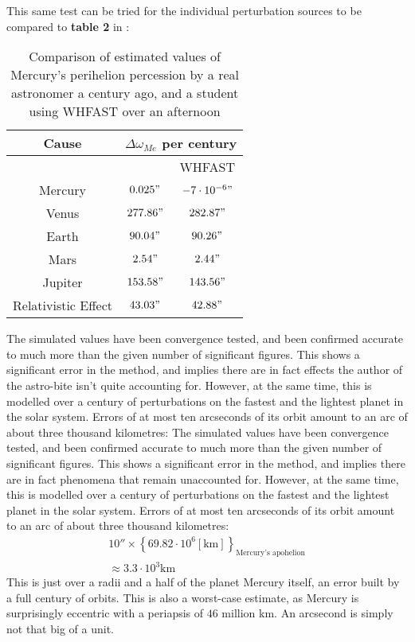 This same test can be tried for the individual perturbation sources to be compared to \textbf{table 2} in \cite[p.~536]{Clemence_1949}:

\begin{table}[h]
    \centering
    \begin{tabular}{c||c|c}
         Cause & \multicolumn{2}{c}{$\Delta \omega_{Me}$ per century} \\
         \hline
         & \cite{Clemence_1949} & WHFAST    \\
         \hline\hline
        Mercury & $0.025"$ & $-7\cdot 10^{-6}"$   \\
        Venus & $277.86"$ & $282.87"$ \\
        Earth & $90.04"$ & $90.26"$   \\  
        Mars & $2.54"$ & $2.44"$\\
        Jupiter & $153.58"$ & $143.56"$   \\
        Relativistic Effect & $43.03"$ & $42.88"$ \\
    \end{tabular}
    \caption{Comparison of estimated values of Mercury's perihelion percession by a real astronomer a century ago, and a student using WHFAST over an afternoon}
    \label{table: Simulated perihilion pertubations}
\end{table}
The simulated values have been convergence tested, and been confirmed accurate to much more than the given number of significant figures. This shows a significant error in the method, and implies there are in fact effects the author of the astro-bite isn't quite accounting for. However, at the same time, this is modelled over a century of perturbations on the fastest and the lightest planet in the solar system. Errors of at most ten arcseconds of its orbit amount to an arc of about three thousand kilometres:
The simulated values have been convergence tested, and been confirmed accurate to much more than the given number of significant figures. This shows a significant error in the method, and implies there are in fact phenomena that remain unaccounted for. However, at the same time, this is modelled over a century of perturbations on the fastest and the lightest planet in the solar system. Errors of at most ten arcseconds of its orbit amount to an arc of about three thousand kilometres:
\begin{multline*}
    10'' \times \left\{69.82 \cdot 10^{6} [\textrm{km}]\right\}_{\textrm{Mercury's apohelion}}
    \\ \approx 3.3 \cdot 10^3 \textrm{km}
\end{multline*}
 This is just over a radii and a half of the planet Mercury itself, an error built by a full century of orbits. This is also a worst-case estimate, as Mercury is surprisingly eccentric with a periapsis of $46$ million km. An arcsecond is simply not that big of a unit.